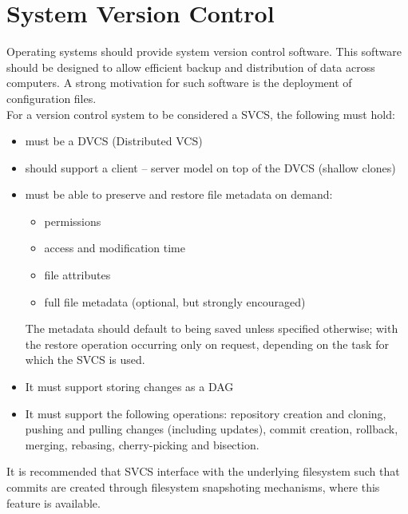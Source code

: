 \section{System Version Control}
Operating systems should provide system version control software. This software should be designed to allow efficient backup and distribution of data across computers. A strong motivation for such software is the deployment of configuration files.\\
For a version control system to be considered a SVCS, the following must hold:
\begin{itemize}
	\item must be a DVCS (Distributed VCS)
	\item should support a client -- server model on top of the DVCS (shallow clones)
	\item must be able to preserve and restore file metadata on demand:
	\begin{itemize}
		\item permissions
		\item access and modification time
		\item file attributes
		\item full file metadata (optional, but strongly encouraged)
	\end{itemize}
	The metadata should default to being saved unless specified otherwise; with the restore operation occurring only on request, depending on the task for which the SVCS is used.
	\item It must support storing changes as a DAG
	\item It must support the following operations: repository creation and cloning, pushing and pulling changes (including updates), commit creation, rollback, merging, rebasing, cherry-picking and bisection.
\end{itemize}
It is recommended that SVCS interface with the underlying filesystem such that commits are created through filesystem snapshoting mechanisms, where this feature is available.
